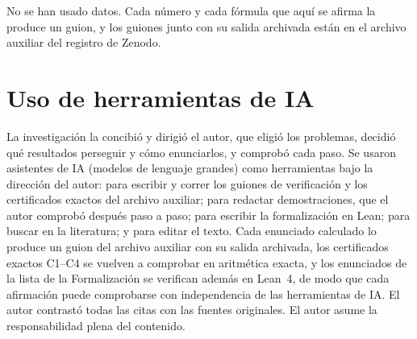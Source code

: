 \documentclass[11pt,a4paper]{article}
\begin{document}
\noindent No se han usado datos. Cada número y cada fórmula que aquí se afirma la produce un guion,
y los guiones junto con su salida archivada están en el
archivo auxiliar del registro de Zenodo.

\section*{Uso de herramientas de IA}

\noindent La investigación la concibió y dirigió el autor, que eligió los problemas, decidió qué
resultados perseguir y cómo enunciarlos, y comprobó cada paso. Se usaron asistentes de IA (modelos
de lenguaje grandes) como herramientas bajo la dirección del autor: para escribir y correr los
guiones de verificación y los certificados exactos del archivo auxiliar; para redactar
demostraciones, que el autor comprobó después paso a paso; para escribir la formalización en Lean;
para buscar en la literatura; y para editar el texto. Cada enunciado calculado lo produce un guion
del archivo auxiliar con su salida archivada, los certificados exactos C1--C4 se vuelven a
comprobar en aritmética exacta, y los enunciados de la lista de la Formalización se verifican
además en Lean~4, de modo que cada afirmación puede comprobarse con independencia de las
herramientas de IA. El autor contrastó todas las citas con las fuentes originales. El autor asume la
responsabilidad plena del contenido.
\end{document}
